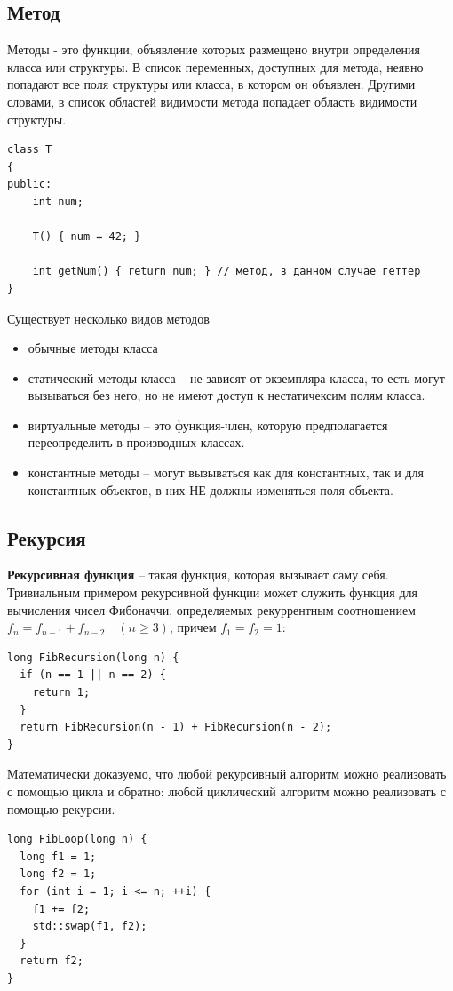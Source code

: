 \subsection{Метод}

Методы - это функции, объявление которых размещено внутри определения класса или структуры. В список переменных, доступных для метода, неявно попадают все поля структуры или класса, в котором он объявлен. Другими словами, в список областей видимости метода попадает область видимости структуры.

\begin{verbatim}
class T
{
public:
    int num;

    T() { num = 42; }

    int getNum() { return num; } // метод, в данном случае геттер
}
\end{verbatim}

Существует несколько видов методов
\begin{itemize}
    \item обычные методы класса
    \item статический методы класса -- не зависят от экземпляра класса, то есть могут вызываться без него, но не имеют доступ к нестатичексим полям класса. 
    \item виртуальные методы -- это функция-член, которую предполагается переопределить в производных классах. 
    \item константные методы -- могут вызываться как для константных, так и для константных объектов, в них НЕ должны изменяться поля объекта. 
\end{itemize}

\subsection{Рекурсия}

\textbf{Рекурсивная функция} -- такая функция, которая вызывает саму себя.
Тривиальным примером рекурсивной функции может служить функция для вычисления чисел Фибоначчи, определяемых рекуррентным соотношением $f_n = f_{n-1} + f_{n-2} \quad (n \geq 3)$, причем $f_1 = f_2 = 1$:
\begin{verbatim}
long FibRecursion(long n) {
  if (n == 1 || n == 2) {
    return 1;
  }
  return FibRecursion(n - 1) + FibRecursion(n - 2);
}  
\end{verbatim}

Математически доказуемо, что любой рекурсивный алгоритм можно реализовать с помощью цикла и обратно: любой циклический алгоритм можно реализовать с помощью рекурсии.
\begin{verbatim}
long FibLoop(long n) {
  long f1 = 1;
  long f2 = 1;
  for (int i = 1; i <= n; ++i) {
    f1 += f2;
    std::swap(f1, f2);
  }
  return f2;
}
\end{verbatim}


